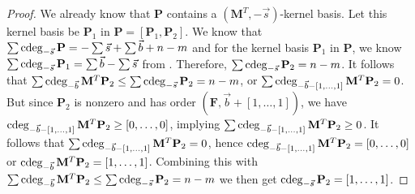 \begin{proof}
We already know that $\mathbf{P}$ contains a $\left(\mathbf{M}^{T},-\vec{s}\right)$-kernel
basis. Let this kernel basis be $\mathbf{P}_{1}$ in $\mathbf{P}=\left[\mathbf{P}_{1},\mathbf{P}_{2}\right]$.
We know that $\sum\cdeg_{-\vec{s}}\mathbf{P}=-\sum\vec{s}+\sum\vec{b}+n-m$
and for the kernel basis $\mathbf{P}_{1}$ in $\mathbf{P}$, we know
$\sum\cdeg_{-\vec{s}}\mathbf{P}_{1}=\sum\vec{b}-\sum\vec{s}$ from
. Therefore, $\sum\cdeg_{-\vec{s}}\mathbf{P}_{2}=n-m$.
It follows that $\sum\cdeg_{-\vec{b}}\mathbf{M}^{T}\mathbf{P}_{2}\le\sum\cdeg_{-\vec{s}}\mathbf{P}_{2}=n-m$,
or $\sum\cdeg_{-\vec{b}-\left[1,\dots,1\right]}\mathbf{M}^{T}\mathbf{P}_{2}=0$.
But since $\mathbf{P}_{2}$ is nonzero and has order $\left(\mathbf{F},\vec{b}+\left[1,\dots,1\right]\right)$,
we have $\cdeg_{-\vec{b}-\left[1,\dots,1\right]}\mathbf{M}^{T}\mathbf{P}_{2}\ge\left[0,\dots,0\right]$,
implying $\sum\cdeg_{-\vec{b}-\left[1,\dots,1\right]}\mathbf{M}^{T}\mathbf{P}_{2}\ge0$.
It follows that $\sum\cdeg_{-\vec{b}-\left[1,\dots,1\right]}\mathbf{M}^{T}\mathbf{P}_{2}=0$,
hence $\cdeg_{-\vec{b}-\left[1,\dots,1\right]}\mathbf{M}^{T}\mathbf{P}_{2}=\left[0,\dots,0\right]$
or $\cdeg_{-\vec{b}}\mathbf{M}^{T}\mathbf{P}_{2}=\left[1,\dots,1\right]$.
Combining this with $\sum\cdeg_{-\vec{b}}\mathbf{M}^{T}\mathbf{P}_{2}\le\sum\cdeg_{-\vec{s}}\mathbf{P}_{2}=n-m$
we then get $\cdeg_{-\vec{s}}\mathbf{P}_{2}=\left[1,\dots,1\right]$.
\end{proof}
